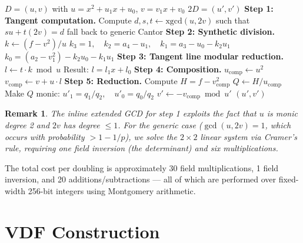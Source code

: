 \documentclass[11pt,a4paper]{article}
\newtheorem{remark}{Remark}[section]
\begin{document}
\begin{algorithm}[H]
\caption{Jacobian Doubling via Tangent (Cantor--Lange)}
\label{alg:double}
\begin{algorithmic}[1]
\Require $D = (u, v)$ with $u = x^2 + u_1 x + u_0$, $v = v_1 x + v_0$
\Ensure $2D = (u', v')$
\State \textbf{Step 1: Tangent computation.}
\State Compute $d, s, t \gets \mathrm{xgcd}(u, 2v)$ such that $su + t(2v) = d$
 fall back to generic Cantor \EndIf
\State \textbf{Step 2: Synthetic division.}
\State $k \gets (f - v^2) / u$ 
\State $k_3 = 1, \quad k_2 = a_4 - u_1, \quad k_1 = a_3 - u_0 - k_2 u_1$
\State $k_0 = (a_2 - v_1^2) - k_2 u_0 - k_1 u_1$
\State \textbf{Step 3: Tangent line modular reduction.}
\State $l \gets t \cdot k \bmod u$ 
\State Result: $l = l_1 x + l_0$
\State \textbf{Step 4: Composition.}
\State $u_{\mathrm{comp}} \gets u^2$ 
\State $v_{\mathrm{comp}} \gets v + u \cdot l$ 
\State \textbf{Step 5: Reduction.}
\State Compute $H = f - v_{\mathrm{comp}}^2$ 
\State $Q \gets H / u_{\mathrm{comp}}$ 
\State Make $Q$ monic: $u'_1 = q_1/q_2, \quad u'_0 = q_0/q_2$
\State $v' \gets -v_{\mathrm{comp}} \bmod u'$ 
\State \Return $(u', v')$
\end{algorithmic}
\end{algorithm}

\begin{remark}
The inline extended GCD for step 1 exploits the fact that $u$ is monic degree 2 and $2v$ has degree $\leq 1$. For the generic case ($\gcd(u, 2v) = 1$, which occurs with probability $> 1 - 1/p$), we solve the $2 \times 2$ linear system via Cramer's rule, requiring one field inversion (the determinant) and six multiplications.
\end{remark}

The total cost per doubling is approximately 30 field multiplications, 1 field inversion, and 20 additions/subtractions --- all of which are performed over fixed-width 256-bit integers using Montgomery arithmetic.

\section{VDF Construction}
\label{sec:vdf}
\end{document}
